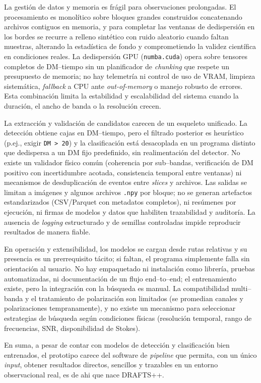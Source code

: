 La gestión de datos y memoria es frágil para observaciones prolongadas. El procesamiento es monolítico sobre bloques grandes construidos concatenando archivos contiguos en memoria, y para completar las ventanas de dedispersión en los bordes se recurre a relleno sintético con ruido aleatorio cuando faltan muestras, alterando la estadística de fondo y comprometiendo la validez científica en condiciones reales. La dedispersión GPU (\texttt{numba.cuda}) opera sobre tensores completos de DM--tiempo sin un planificador de \textit{chunking} que respete un presupuesto de memoria; no hay telemetría ni control de uso de VRAM, limpieza sistemática, \textit{fallback} a CPU ante \emph{out-of-memory} o manejo robusto de errores. Esta combinación limita la estabilidad y escalabilidad del sistema cuando la duración, el ancho de banda o la resolución crecen.

La extracción y validación de candidatos carecen de un esqueleto unificado. La detección obtiene cajas en DM--tiempo, pero el filtrado posterior es heurístico (p.ej., exigir \texttt{DM > 20}) y la clasificación está desacoplada en un programa distinto que dedispersa a un DM fijo predefinido, sin realimentación del detector. No existe un validador físico común (coherencia por sub--bandas, verificación de DM positivo con incertidumbre acotada, consistencia temporal entre ventanas) ni mecanismos de desduplicación de eventos entre \emph{slices} y archivos. Las salidas se limitan a imágenes y algunos archivos \texttt{.npy} por bloque; no se generan artefactos estandarizados (CSV/Parquet con metadatos completos), ni resúmenes por ejecución, ni firmas de modelos y datos que habiliten trazabilidad y auditoría. La ausencia de \emph{logging} estructurado y de semillas controladas impide reproducir resultados de manera fiable.

En operación y extensibilidad, los modelos se cargan desde rutas relativas y su presencia es un prerrequisito tácito; si faltan, el programa simplemente falla sin orientación al usuario. No hay empaquetado ni instalación como librería, pruebas automatizadas, ni documentación de un flujo end--to--end; el entrenamiento existe, pero la integración con la búsqueda es manual. La compatibilidad multi--banda y el tratamiento de polarización son limitados (se promedian canales y polarizaciones tempranamente), y no existe un mecanismo para seleccionar estrategias de búsqueda según condiciones físicas (resolución temporal, rango de frecuencias, SNR, disponibilidad de Stokes). 

En suma, a pesar de contar con modelos de detección y clasificación bien entrenados, el prototipo carece del software de \emph{pipeline} que permita, con un único \emph{input}, obtener resultados directos, sencillos y trazables en un entorno observacional real, es de ahi que nace DRAFTS++.

